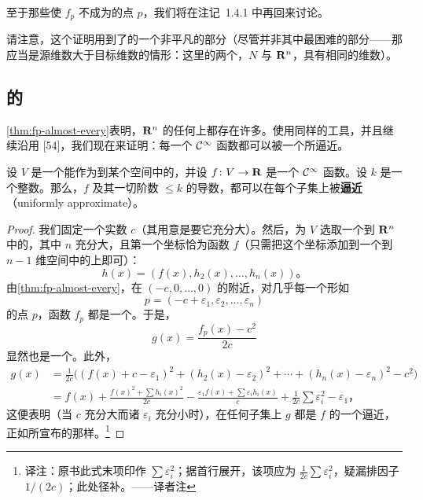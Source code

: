 至于那些使 $f_p$ 不成为\trMorseFunction{}的点 $p$，我们将在注记~1.4.1 中再回来讨论。

\begin{remark}\label{thm:sard-nontrivial-part}
请注意，这个证明用到了\trSardTheorem{}的一个非平凡的部分（尽管并非其中最困难的部分——那应当是源\trManifold{}维数大于目标维数的情形：这里的两个\trManifold，$N$ 与 $\mathbf{R}^n$，具有相同的维数）。
\end{remark}

\subsection{\trMorseFunction{}的\trGenericity}

\cref{thm:fp-almost-every}表明，$\mathbf{R}^n$ 的任何\trSubmanifold{}上都存在许多\trMorseFunction。使用同样的工具，并且继续沿用 [54]，我们现在来证明：每一个 $\mathcal{C}^\infty$ 函数都可以被一个\trMorseFunction{}所逼近。

\begin{proposition}\label{thm:uniform-approximation-morse}
设 $V$ 是一个能作为\trSubmanifold\trEmbedding{}到某个\trEuclidean{}空间中的\trManifold，并设 $f\colon V\to\mathbf{R}$ 是一个 $\mathcal{C}^\infty$ 函数。设 $k$ 是一个整数。那么，$f$ 及其一切阶数 $\leq k$ 的导数，都可以在每个\trCompact{}子集上被\trMorseFunction\textbf{\trUniform{}逼近}（uniformly approximate）。
\end{proposition}

\begin{proof}
我们固定一个实数 $c$（其用意是要它充分大）。然后，为 $V$ 选取一个到 $\mathbf{R}^n$ 中的\trEmbedding，其中 $n$ 充分大，且第一个坐标恰为函数 $f$（只需把这个坐标添加到一个到 $n-1$ 维空间中的\trEmbedding{}上即可）：
\[
h(x)=(f(x),h_2(x),\dotsc,h_n(x))\text{。}
\]
由\cref{thm:fp-almost-every}，在 $(-c,0,\dotsc,0)$ 的附近，对几乎每一个形如
\[
p=(-c+\varepsilon_1,\varepsilon_2,\dotsc,\varepsilon_n)
\]
的点 $p$，函数 $f_p$ 都是一个\trMorseFunction。于是，
\[
g(x)=\frac{f_p(x)-c^2}{2c}
\]
显然也是一个\trMorseFunction。此外，
\[
\begin{aligned}
g(x)&=\frac{1}{2c}\bigl((f(x)+c-\varepsilon_1)^2
  +(h_2(x)-\varepsilon_2)^2+\dotsb+(h_n(x)-\varepsilon_n)^2-c^2\bigr)\\
&=f(x)+\frac{f(x)^2+\sum h_i(x)^2}{2c}
  -\frac{\varepsilon_1 f(x)+\sum\varepsilon_i h_i(x)}{c}
  +\frac{1}{2c}\sum\varepsilon_i^2-\varepsilon_1\text{，}
\end{aligned}
\]
这便表明（当 $c$ 充分大而诸 $\varepsilon_i$ 充分小时），在任何\trCompact{}子集上 $g$ 都是 $f$ 的一个\trUniform{}逼近，正如所宣布的那样。\footnote{译注：原书此式末项印作 $\sum\varepsilon_i^2$；据首行展开，该项应为 $\frac{1}{2c}\sum\varepsilon_i^2$，疑漏排因子 $1/(2c)$；此处径补。——译者注}
\end{proof}

